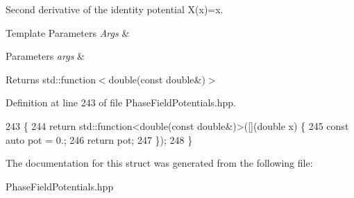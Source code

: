 Second derivative of the identity potential X(x)=x. 


\begin{DoxyTemplParams}{Template Parameters}
{\em Args} & \\
\hline
\end{DoxyTemplParams}

\begin{DoxyParams}{Parameters}
{\em args} & \\
\hline
\end{DoxyParams}
\begin{DoxyReturn}{Returns}
std\+::function$<$double(const double\&)$>$ 
\end{DoxyReturn}


Definition at line 243 of file Phase\+Field\+Potentials.\+hpp.


\begin{DoxyCode}
243                                                         \{
244     \textcolor{keywordflow}{return} std::function<double(const double&)>([](\textcolor{keywordtype}{double} x) \{
245       \textcolor{keyword}{const} \textcolor{keyword}{auto} pot = 0.;
246       \textcolor{keywordflow}{return} pot;
247     \});
248   \}
\end{DoxyCode}


The documentation for this struct was generated from the following file\+:\begin{DoxyCompactItemize}
\item 
Phase\+Field\+Potentials.\+hpp\end{DoxyCompactItemize}
